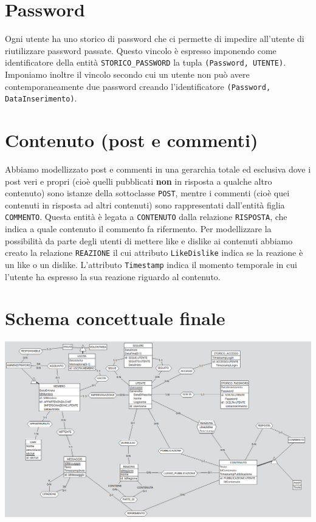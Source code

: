 \documentclass[a4paper,12pt]{report}
\begin{document}
\section{Password}
Ogni utente ha uno storico di password che ci permette di impedire all'utente di riutilizzare password passate. Questo vincolo è espresso imponendo come identificatore della entità \texttt{STORICO\_PASSWORD} la tupla \texttt{(Password, UTENTE)}. Imponiamo inoltre il vincolo secondo cui un utente non può avere contemporaneamente due password creando l'identificatore \texttt{(Password, DataInserimento)}.

\section{Contenuto (post e commenti)}
Abbiamo modellizzato post e commenti in una gerarchia totale ed esclusiva dove i post veri e propri (cioè quelli pubblicati \textbf{non} in risposta a qualche altro contenuto) sono istanze della sottoclasse \texttt{POST}, mentre i commenti (cioè quei contenuti in risposta ad altri contenuti) sono rappresentati dall'entità figlia \texttt{COMMENTO}. Questa entità è legata a \texttt{CONTENUTO} dalla relazione \texttt{RISPOSTA}, che indica a quale contenuto il commento fa rifermento.
Per modellizzare la possibilità da parte degli utenti di mettere like e dislike ai contenuti abbiamo creato la relazione \texttt{REAZIONE} il cui attributo \texttt{LikeDislike} indica se la reazione è un like o un dislike. L'attributo \texttt{Timestamp} indica il momento temporale in cui l'utente ha espresso la sua reazione riguardo al contenuto. 

\section{Schema concettuale finale}
\includegraphics[scale=0.6, angle=90]{./img/concettuale.png}
\end{document}
